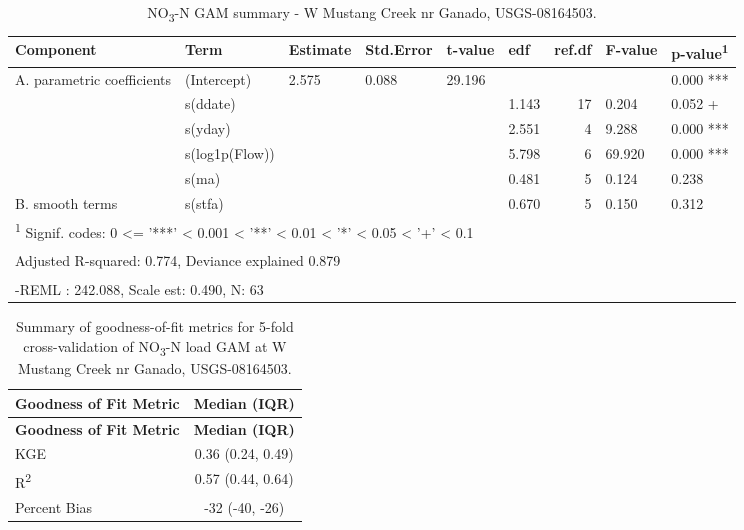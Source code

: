 \documentclass[
]{article}
\newenvironment{widestuff}{\begin{table}[h]\begin{adjustwidth}{-4.5cm}{-4.5cm}\centering}{\end{adjustwidth}\end{table}}
\begin{document}
\begin{widestuff}

\caption{NO\textsubscript{3}-N GAM summary - W Mustang Creek nr Ganado, USGS-08164503.}
\centering
\begin{tabular}[t]{llllllrll}
\toprule
Component & Term & Estimate & Std.Error & t-value & edf & ref.df & F-value & p-value\textsuperscript{1}\\
\midrule
A. parametric coefficients & (Intercept) & 2.575 & 0.088 & 29.196 &  &  &  & 0.000 ***\\
\cmidrule{1-9}
 & s(ddate) &  &  &  & 1.143 & 17 & 0.204 & 0.052 +\\

 & s(yday) &  &  &  & 2.551 & 4 & 9.288 & 0.000 ***\\

 & s(log1p(Flow)) &  &  &  & 5.798 & 6 & 69.920 & 0.000 ***\\

 & s(ma) &  &  &  & 0.481 & 5 & 0.124 & 0.238\\

\multirow[t]{-5}{*}{\raggedright\arraybackslash B. smooth terms} & s(stfa) &  &  &  & 0.670 & 5 & 0.150 & 0.312\\
\bottomrule
\multicolumn{9}{l}{\textsuperscript{1} Signif. codes: 0 <= '***' < 0.001 < '**' < 0.01 < '*' < 0.05 < '+' < 0.1}\\
\multicolumn{9}{l}{\textsuperscript{} Adjusted R-squared: 0.774, Deviance explained 0.879}\\
\multicolumn{9}{l}{\textsuperscript{} -REML : 242.088, Scale est: 0.490, N: 63}\\
\end{tabular}
\end{widestuff}

\hypertarget{tbl-NO08164503-CV}{}
\begin{longtable}[]{@{}lc@{}}
\caption{\label{tbl-NO08164503-CV}Summary of goodness-of-fit metrics for
5-fold cross-validation of NO\textsubscript{3}-N load GAM at W Mustang
Creek nr Ganado, USGS-08164503.}\tabularnewline
\toprule()
\textbf{Goodness of Fit Metric} & \textbf{Median (IQR)} \\
\midrule()
\endfirsthead
\toprule()
\textbf{Goodness of Fit Metric} & \textbf{Median (IQR)} \\
\midrule()
\endhead
KGE & 0.36 (0.24, 0.49) \\
R\textsuperscript{2} & 0.57 (0.44, 0.64) \\
Percent Bias & -32 (-40, -26) \\
\bottomrule()
\end{longtable}
\end{document}
